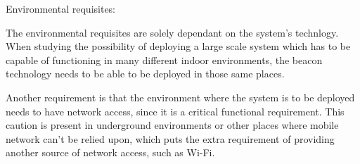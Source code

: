 Environmental requisites:

The environmental requisites are solely dependant on the system's technlogy. When studying the possibility of deploying a large scale system which has to be capable of functioning in many different indoor environments, the beacon technology needs to be able to be deployed in those same places.

Another requirement is that the environment where the system is to be deployed needs to have network access, since it is a critical functional requirement. This caution is present in underground environments or other places where mobile network can't be relied upon, which puts the extra requirement of providing another source of network access, such as Wi-Fi.











